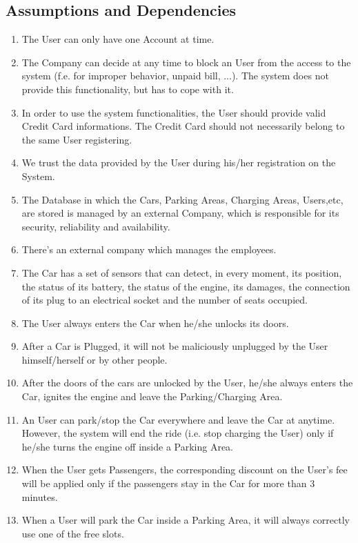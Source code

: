 \subsection{Assumptions and Dependencies}
\begin{enumerate}
	\item The User can only have one Account at time.
	\item The Company can decide at any time to block an User from the access to the system (f.e. for improper behavior, unpaid bill, ...). The system does not provide this functionality, but has to cope with it.
	\item In order to use the system functionalities, the User should provide valid Credit Card informations. The Credit Card should not necessarily belong to the same User registering.
	\item We trust the data provided by the User during his/her registration on the System.
	\item The Database in which the Cars, Parking Areas, Charging Areas, Users,etc, are stored is managed by an external Company, which is responsible for its security, reliability and availability.
	\item There's an external company which manages the employees.
	\item The Car has a set of sensors that can detect, in every moment, its position, the status of its battery, the status of the engine, its damages, the connection of its plug to an electrical socket and the number of seats occupied.
	\item The User always enters the Car when he/she unlocks its doors.	
	\item After a Car is Plugged, it will not be maliciously unplugged by the User himself/herself or by other people.
	\item After the doors of the cars are unlocked by the User, he/she always enters the Car, ignites the engine and leave the Parking/Charging Area.
	\item An User can park/stop the Car everywhere and leave the Car at anytime. However, the system will end the ride (i.e. stop charging the User) only if he/she turns the engine off inside a Parking Area.
	\item When the User gets Passengers, the corresponding discount on the User's fee will be applied only if the passengers stay in the Car for more than 3 minutes.	
	\item When a User will park the Car inside a Parking Area, it will always correctly use one of the free slots.

\end{enumerate}
